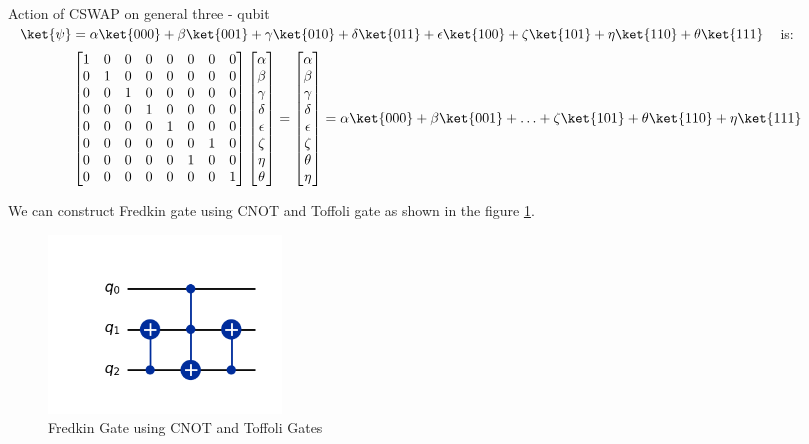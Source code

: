 \documentclass[12pt, oneside]{book}
\theoremstyle{definition}
\theoremstyle{definition}
\theoremstyle{remark}
\begin{document}
Action of CSWAP on general three - qubit $\ket{\psi} = \alpha\ket{000}+\beta\ket{001}+\gamma\ket{010}+\delta\ket{011}+\epsilon\ket{100}+\zeta\ket{101}+\eta\ket{110}+\theta\ket{111}$ is:
\[
    \begin{bmatrix} 
        1 & 0 & 0 & 0 & 0 & 0 & 0 & 0 \\
        0 & 1 & 0 & 0 & 0 & 0 & 0 & 0 \\
        0 & 0 & 1 & 0 & 0 & 0 & 0 & 0 \\
        0 & 0 & 0 & 1 & 0 & 0 & 0 & 0 \\
        0 & 0 & 0 & 0 & 1 & 0 & 0 & 0 \\
        0 & 0 & 0 & 0 & 0 & 0 & 1 & 0 \\
        0 & 0 & 0 & 0 & 0 & 1 & 0 & 0 \\
        0 & 0 & 0 & 0 & 0 & 0 & 0 & 1
    \end{bmatrix}\begin{bmatrix}
        \alpha \\
        \beta \\
        \gamma \\
        \delta \\
        \epsilon \\
        \zeta \\
        \eta \\
        \theta
    \end{bmatrix}=\begin{bmatrix}
        \alpha \\
        \beta \\
        \gamma \\
        \delta \\
        \epsilon \\
        \zeta \\
        \theta \\
        \eta
    \end{bmatrix}=\alpha\ket{000}+\beta\ket{001}+\ldots+\zeta\ket{101}+\theta\ket{110}+\eta\ket{111}
\]

We can construct Fredkin gate using CNOT and Toffoli gate as shown in the figure \ref{fig:fredkin-cnot1}.
\begin{figure}[H]
    \centering
    \includegraphics[width=0.3\textwidth]{../images/cswap-gatemeth1.png}
    \caption{Fredkin Gate using CNOT and Toffoli Gates}
    \label{fig:fredkin-cnot1}
\end{figure}
\end{document}
